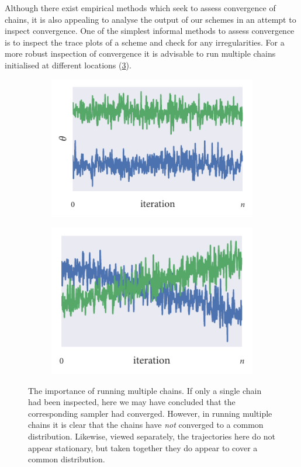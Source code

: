 Although there exist empirical methods which seek to assess convergence of chains, it is
also appealing to analyse the output of our schemes in an attempt to inspect convergence.
One of the simplest informal methods to assess convergence is to inspect the trace plots
of a scheme and check for any irregularities. For a more robust inspection of convergence
it is advisable to run multiple chains initialised at different locations
(\cref{fig:convergence}).
\begin{figure}[tb]
  \begin{subfigure}[b]{0.5\textwidth}
    \centering
    \includegraphics{B.pdf}
    \subcaption{}
    \label{fig:B}
  \end{subfigure}%
  \begin{subfigure}[b]{0.5\textwidth}
    \centering
    \includegraphics{W.pdf}
    \subcaption{}
    \label{fig:W}
  \end{subfigure}
  \caption{The importance of running multiple chains.  If only a single
    chain had been inspected, here we may have concluded that the corresponding sampler
    had converged. However, in running multiple chains it is clear that the chains have
    \emph{not} converged to a common distribution.  Likewise, viewed
    separately, the trajectories here do not appear stationary, but taken together
    they do appear to cover a common distribution.}
  \label{fig:convergence}
\end{figure}

